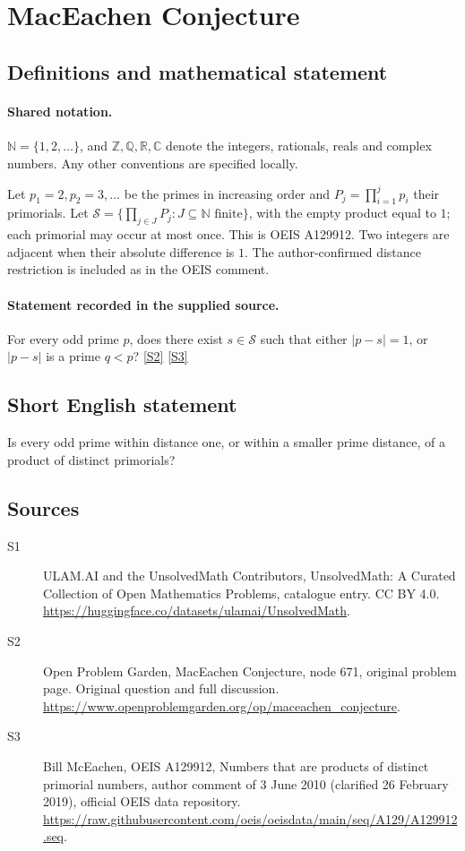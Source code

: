 \documentclass[11pt]{article}
\newcommand{\sref}[2]{\hyperlink{source:#1:#2}{[S#2]}}
\begin{document}
\section{MacEachen Conjecture}\label{statement}

\subsection{Definitions and mathematical statement}

\paragraph{Shared notation.}$\mathbb N=\{1,2,\ldots\}$, and $\mathbb Z,\mathbb Q,\mathbb R,\mathbb C$ denote the integers, rationals, reals and complex numbers. Any other conventions are specified locally.


Let $p_1=2,p_2=3,\ldots$ be the primes in increasing order and $P_j=\prod_{i=1}^j p_i$ their primorials. Let $\mathcal S=\{\prod_{j\in J}P_j:J\subseteq\mathbb N\text{ finite}\}$, with the empty product equal to $1$; each primorial may occur at most once. This is OEIS A129912. Two integers are adjacent when their absolute difference is $1$. The author-confirmed distance restriction is included as in the OEIS comment.
\paragraph{Statement recorded in the supplied source.}
For every odd prime $p$, does there exist $s\in\mathcal S$ such that either $|p-s|=1$, or $|p-s|$ is a prime $q<p$? \sref{statement}{2} \sref{statement}{3}
\subsection{Short English statement}
Is every odd prime within distance one, or within a smaller prime distance, of a product of distinct primorials?
\subsection{Sources}
\begin{description}
\item[\hypertarget{source:statement:1}{S1}] ULAM.AI and the UnsolvedMath Contributors, UnsolvedMath: A Curated Collection of Open Mathematics Problems, catalogue entry. CC BY 4.0. \url{https://huggingface.co/datasets/ulamai/UnsolvedMath}.
\item[\hypertarget{source:statement:2}{S2}] Open Problem Garden, MacEachen Conjecture, node 671, original problem page. Original question and full discussion. \url{https://www.openproblemgarden.org/op/maceachen_conjecture}.
\item[\hypertarget{source:statement:3}{S3}] Bill McEachen, OEIS A129912, Numbers that are products of distinct primorial numbers, author comment of 3 June 2010 (clarified 26 February 2019), official OEIS data repository. \url{https://raw.githubusercontent.com/oeis/oeisdata/main/seq/A129/A129912.seq}.
\end{description}
\label{end:statement}
\end{document}

